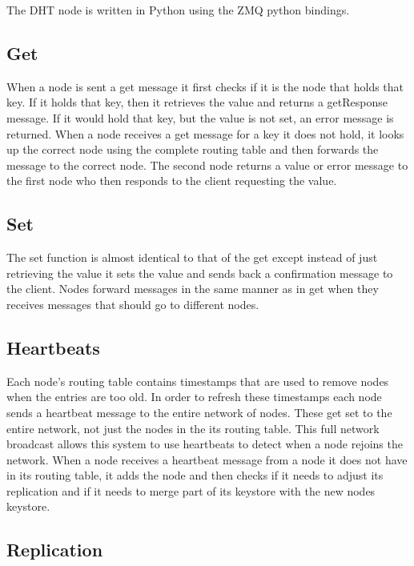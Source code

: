 \documentclass[11pt]{article}
\begin{document}
The DHT node is written in Python using the ZMQ python bindings. 

\subsection{Get}\label{sec:get}

When a node is sent a get message it first checks if it is the node that holds that key. If it holds that key, then it retrieves the value and returns a getResponse message. If it would hold that key, but the value is not set, an error message is returned. When a node receives a get message for a key it does not hold, it looks up the correct node using the complete routing table and then forwards the message to the correct node. The second node returns a value or error message to the first node who then responds to the client requesting the value.

\subsection{Set}\label{sec:set}

The set function is almost identical to that of the get except instead of just retrieving the value it sets the value and sends back a confirmation message to the client. Nodes forward messages in the same manner as in get when they receives messages that should go to different nodes.

\subsection{Heartbeats}\label{sec:HB}

Each node's routing table contains timestamps that are used to remove nodes when the entries are too old. In order to refresh these timestamps each node sends a heartbeat message to the entire network of nodes. These get set to the entire network, not just the nodes in the its routing table. This full network broadcast allows this system to use heartbeats to detect when a node rejoins the network. When a node receives a heartbeat message from a node it does not have in its routing table, it adds the node and then checks if it needs to adjust its replication and if it needs to merge part of its keystore with the new nodes keystore.

\subsection{Replication}\label{sec:Rep}
\end{document}
